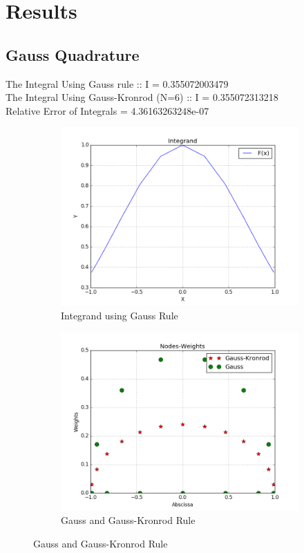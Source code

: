 \documentclass[a4paper]{article}
\begin{document}
\section*{Results}

\subsection*{Gauss Quadrature}

The Integral Using Gauss rule :: I = 0.355072003479 \\
The Integral Using Gauss-Kronrod (N=6) :: I = 0.355072313218 \\
Relative Error of Integrals  = 4.36163263248e-07 \\



\begin{figure}[h]
\begin{subfigure}[b]{0.49\textwidth}
\includegraphics[width=\textwidth]{g1.png}
\caption{Integrand using Gauss Rule}
\end{subfigure}
\begin{subfigure}[b]{0.49\textwidth}
\includegraphics[width=\textwidth]{g2.png}
\caption{Gauss and Gauss-Kronrod Rule}
\end{subfigure}
\end{figure}
\end{document}

